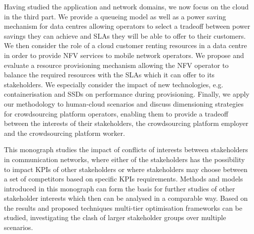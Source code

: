 Having studied the application and network domains, we now focus on the cloud in the third part.
We provide a queueing model as well as a power saving mechanism for data centres allowing operators to select a tradeoff between power savings they can achieve and \glspl{SLA} they will be able to offer to their customers.
We then consider the role of a cloud customer renting resources in a data centre in order to provide \gls{NFV} services to mobile network operators.
We propose and evaluate a resource provisioning mechanism allowing the \gls{NFV} operator to balance the required resources with the \glspl{SLA} which it can offer to its stakeholders.
We especially consider the impact of new technologies, e.g. containerisation and \glspl{SSD} on performance during provisioning.
Finally, we apply our methodology to human-cloud scenarios and discuss dimensioning strategies for crowdsourcing platform operators, enabling them to provide a tradeoff between the interests of their stakeholders, the crowdsourcing platform employer and the crowdsourcing platform worker.

This monograph studies the impact of conflicts of interests between stakeholders in communication networks, where either of the stakeholders has the possibility to impact \glspl{KPI} of other stakeholders or where stakeholders may choose between a set of competitors based on specific \glspl{KPI} requirements.
Methods and models introduced in this monograph can form the basis for further studies of other stakeholder interests which then can be analysed in a comparable way.
Based on the results and proposed techniques multi-tier optimisation frameworks can be studied, investigating the clash of larger stakeholder groups over multiple scenarios.
